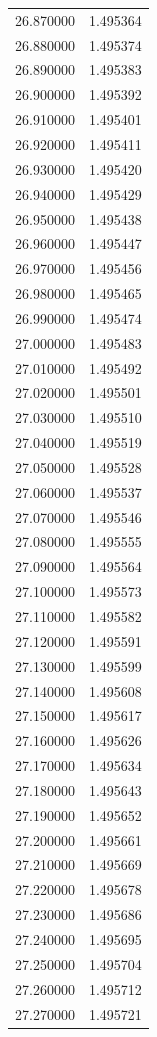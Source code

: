 \begin{tabular}{rr}
26.870000 & 1.495364 \\
26.880000 & 1.495374 \\
26.890000 & 1.495383 \\
26.900000 & 1.495392 \\
26.910000 & 1.495401 \\
26.920000 & 1.495411 \\
26.930000 & 1.495420 \\
26.940000 & 1.495429 \\
26.950000 & 1.495438 \\
26.960000 & 1.495447 \\
26.970000 & 1.495456 \\
26.980000 & 1.495465 \\
26.990000 & 1.495474 \\
27.000000 & 1.495483 \\
27.010000 & 1.495492 \\
27.020000 & 1.495501 \\
27.030000 & 1.495510 \\
27.040000 & 1.495519 \\
27.050000 & 1.495528 \\
27.060000 & 1.495537 \\
27.070000 & 1.495546 \\
27.080000 & 1.495555 \\
27.090000 & 1.495564 \\
27.100000 & 1.495573 \\
27.110000 & 1.495582 \\
27.120000 & 1.495591 \\
27.130000 & 1.495599 \\
27.140000 & 1.495608 \\
27.150000 & 1.495617 \\
27.160000 & 1.495626 \\
27.170000 & 1.495634 \\
27.180000 & 1.495643 \\
27.190000 & 1.495652 \\
27.200000 & 1.495661 \\
27.210000 & 1.495669 \\
27.220000 & 1.495678 \\
27.230000 & 1.495686 \\
27.240000 & 1.495695 \\
27.250000 & 1.495704 \\
27.260000 & 1.495712 \\
27.270000 & 1.495721 \\

\end{tabular}
